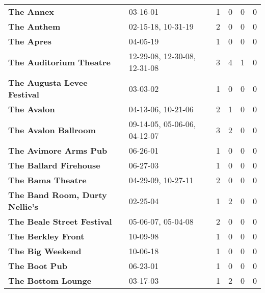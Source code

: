 \begin{supertabular}{llllll}
                                                   \textbf{The Annex} &                      03-16-01 &  1 &   0 &  0 &  0 \\
                                                  \textbf{The Anthem} &            02-15-18, 10-31-19 &  2 &   0 &  0 &  0 \\
                                                   \textbf{The Apres} &                      04-05-19 &  1 &   0 &  0 &  0 \\
                                      \textbf{The Auditorium Theatre} &  12-29-08, 12-30-08, 12-31-08 &  3 &   4 &  1 &  0 \\
                                  \textbf{The Augusta Levee Festival} &                      03-03-02 &  1 &   0 &  0 &  0 \\
                                                  \textbf{The Avalon} &            04-13-06, 10-21-06 &  2 &   1 &  0 &  0 \\
                                         \textbf{The Avalon Ballroom} &  09-14-05, 05-06-06, 04-12-07 &  3 &   2 &  0 &  0 \\
                                        \textbf{The Avimore Arms Pub} &                      06-26-01 &  1 &   0 &  0 &  0 \\
                                       \textbf{The Ballard Firehouse} &                      06-27-03 &  1 &   0 &  0 &  0 \\
                                            \textbf{The Bama Theatre} &            04-29-09, 10-27-11 &  2 &   0 &  0 &  0 \\
                               \textbf{The Band Room, Durty Nellie's} &                      02-25-04 &  1 &   2 &  0 &  0 \\
                                   \textbf{The Beale Street Festival} &            05-06-07, 05-04-08 &  2 &   0 &  0 &  0 \\
                                           \textbf{The Berkley Front} &                      10-09-98 &  1 &   0 &  0 &  0 \\
                                             \textbf{The Big Weekend} &                      10-06-18 &  1 &   0 &  0 &  0 \\
                                                \textbf{The Boot Pub} &                      06-23-01 &  1 &   0 &  0 &  0 \\
                                           \textbf{The Bottom Lounge} &                      03-17-03 &  1 &   2 &  0 &  0 \\

\end{supertabular}
